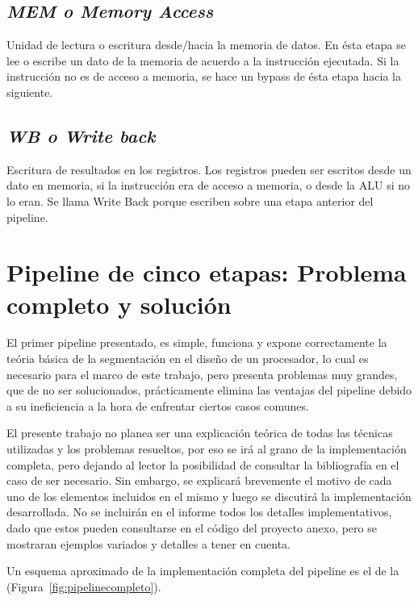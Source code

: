 \documentclass[12pt]{article}
\begin{document}
\subsection{\textit{MEM o Memory Access}}
Unidad de lectura o escritura desde/hacia la memoria de datos. En ésta etapa se lee o escribe un dato de la memoria de acuerdo a la instrucción ejecutada. Si la instrucción no es de acceso a memoria, se hace un bypass de ésta etapa hacia la siguiente.

\subsection{\textit{WB o Write back}}
Escritura de resultados en los registros. Los registros pueden ser escritos desde un dato en memoria, si la instrucción era de acceso a memoria, o desde la ALU si no lo eran. Se llama Write Back porque escriben sobre una etapa anterior del pipeline.

\section{Pipeline de cinco etapas: Problema completo y solución}

El primer pipeline presentado, es simple, funciona y expone correctamente la teória básica de la segmentación en el diseño de un procesador, lo cual es necesario para el marco de este trabajo, pero presenta problemas muy grandes, que de no ser solucionados, prácticamente elimina las ventajas del pipeline debido a su ineficiencia a la hora de enfrentar ciertos casos comunes.

El presente trabajo no planea ser una explicación teórica de todas las técnicas utilizadas y los problemas resueltos, por eso se irá al grano de la implementación completa, pero dejando al lector la posibilidad de consultar la bibliografía en el caso de ser necesario. Sin embargo, se explicará brevemente el motivo de cada uno de los elementos incluidos en el mismo y luego se discutirá la implementación desarrollada. No se incluirán en el informe todos los detalles implementativos, dado que estos pueden consultarse en el código del proyecto anexo, pero se mostraran ejemplos variados y detalles a tener en cuenta.

Un esquema aproximado de la implementación completa del pipeline es el de la (Figura~\ref{fig:pipelinecompleto}).
\end{document}

